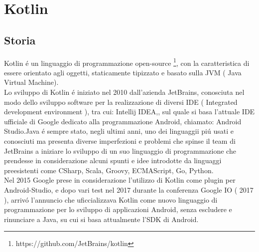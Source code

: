 \chapter{Kotlin}                %
\lhead[\fancyplain{}{\bfseries\thepage}]{\fancyplain{}{\bfseries\rightmark}}
\section{Storia}                 %

Kotlin \'e un linguaggio di programmazione open-source \footnote{https://github.com/JetBrains/kotlin}, con la caratteristica di essere orientato agli oggetti, staticamente tipizzato  e basato sulla JVM ( Java Virtual Machine).\\
Lo sviluppo di Kotlin \'e iniziato nel 2010 dall'azienda JetBrains, conosciuta nel modo dello sviluppo software per la realizzazione di diversi IDE ( Integrated development environment ), tra cui: Intellij IDEA,, sul quale si basa l'attuale IDE ufficiale di Google dedicato alla programmazione Android, chiamato: Android Studio.Java \'e sempre stato, negli ultimi anni, uno dei linguaggii  pi\'u usati e conosciuti ma presenta diverse imperfezioni e problemi che spinse il team di JetBrains a iniziare lo sviluppo di un suo linguaggio di programmazione che prendesse in considerazione alcuni spunti e idee introdotte da linguaggi preesistenti come CSharp, Scala, Groovy, ECMAScript, Go, Python.\\
Nel 2015 Google prese in considerazione l'utilizzo di Kotlin come plugin per Android-Studio, e dopo vari test nel 2017  durante la conferenza Google IO ( 2017 ), arriv\'o l'annuncio che uficcializzava Kotlin come nuovo linguaggio di programmazione per lo sviluppo di applicazioni Android, senza escludere e rinunciare a Java, su cui si basa attualmente l'SDK di Android.


